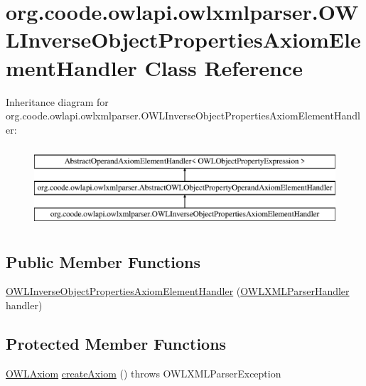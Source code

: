 \hypertarget{classorg_1_1coode_1_1owlapi_1_1owlxmlparser_1_1_o_w_l_inverse_object_properties_axiom_element_handler}{\section{org.\-coode.\-owlapi.\-owlxmlparser.\-O\-W\-L\-Inverse\-Object\-Properties\-Axiom\-Element\-Handler Class Reference}
\label{classorg_1_1coode_1_1owlapi_1_1owlxmlparser_1_1_o_w_l_inverse_object_properties_axiom_element_handler}
}
Inheritance diagram for org.\-coode.\-owlapi.\-owlxmlparser.\-O\-W\-L\-Inverse\-Object\-Properties\-Axiom\-Element\-Handler\-:\begin{figure}[H]
\begin{center}
\leavevmode
\includegraphics[height=3.000000cm]{classorg_1_1coode_1_1owlapi_1_1owlxmlparser_1_1_o_w_l_inverse_object_properties_axiom_element_handler}
\end{center}
\end{figure}
\subsection*{Public Member Functions}
\begin{DoxyCompactItemize}
\item 
\hyperlink{classorg_1_1coode_1_1owlapi_1_1owlxmlparser_1_1_o_w_l_inverse_object_properties_axiom_element_handler_acf6adadf93bf5286a974e4de9e8270d9}{O\-W\-L\-Inverse\-Object\-Properties\-Axiom\-Element\-Handler} (\hyperlink{classorg_1_1coode_1_1owlapi_1_1owlxmlparser_1_1_o_w_l_x_m_l_parser_handler}{O\-W\-L\-X\-M\-L\-Parser\-Handler} handler)
\end{DoxyCompactItemize}
\subsection*{Protected Member Functions}
\begin{DoxyCompactItemize}
\item 
\hyperlink{interfaceorg_1_1semanticweb_1_1owlapi_1_1model_1_1_o_w_l_axiom}{O\-W\-L\-Axiom} \hyperlink{classorg_1_1coode_1_1owlapi_1_1owlxmlparser_1_1_o_w_l_inverse_object_properties_axiom_element_handler_a3740aa710873e2a687638a93f4a86689}{create\-Axiom} ()  throws O\-W\-L\-X\-M\-L\-Parser\-Exception 
\end{DoxyCompactItemize}


